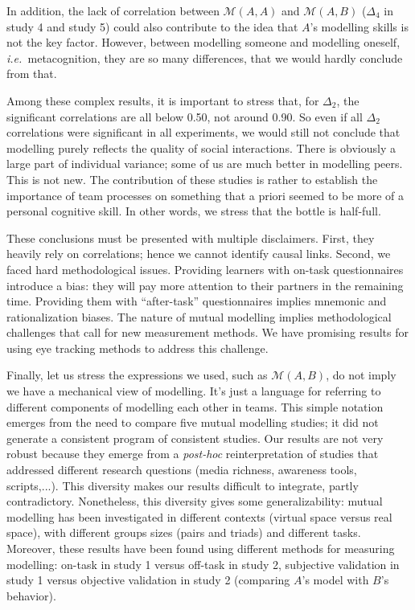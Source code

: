 \documentclass[natbib]{svjour3}
\newcommand{\ie}{{\textit{i.e.\ }}}
\newcommand{\gmodel}[2]{{$\mathcal{M}(#1, #2)$}}
\begin{document}
In addition, the lack of correlation between \gmodel{A}{A} and \gmodel{A}{B}
($\Delta_4$ in study 4 and study 5) could also contribute to the idea that $A$'s
modelling skills is not the key factor. However, between modelling someone and
modelling oneself, \ie  metacognition, they are so many differences, that we
would hardly conclude from that.

Among these complex results, it is important to stress that, for $\Delta_2$, the
significant correlations are all below 0.50, not around 0.90.  So even if all
$\Delta_2$ correlations were significant in all experiments, we would still not
conclude that modelling purely reflects the quality of social interactions.
There is obviously a large part of individual variance; some of us are much
better in modelling peers. This is not new. The contribution of these studies is
rather to establish the importance of team processes on something that a priori
seemed to be more of a personal cognitive skill.  In other words, we stress that
the bottle is half-full. 

These conclusions must be presented with multiple disclaimers. First, they
heavily rely on correlations; hence we cannot identify causal links. Second, we
faced hard methodological issues. Providing learners with on-task questionnaires
introduce a bias: they will pay more attention to their partners in the
remaining time. Providing them with ``after-task'' questionnaires implies mnemonic
and rationalization biases. The nature of mutual modelling implies methodological
challenges that call for new  measurement methods. We have promising results for
using eye tracking methods to address this challenge.

Finally, let us stress the expressions we used, such as \gmodel{A}{B}, do not
imply we have a mechanical view of modelling. It's just a language for referring
to different components of modelling each other in teams.  This simple notation
emerges from the need to compare five mutual modelling studies; it did not
generate a consistent program of consistent studies.  Our results are not very
robust because they emerge from a \emph{post-hoc} reinterpretation of studies
that addressed different research questions (media richness, awareness tools,
scripts,...). This diversity makes our results difficult to integrate, partly
contradictory. Nonetheless, this diversity gives some generalizability: mutual
modelling has been investigated in different contexts (virtual space versus real
space), with different groups sizes (pairs and triads) and different tasks.
Moreover, these results have been found using different methods for measuring
modelling: on-task in study 1 versus off-task in study 2, subjective validation
in study 1 versus objective validation in study 2 (comparing $A$'s model with $B$'s
behavior).
\end{document}
